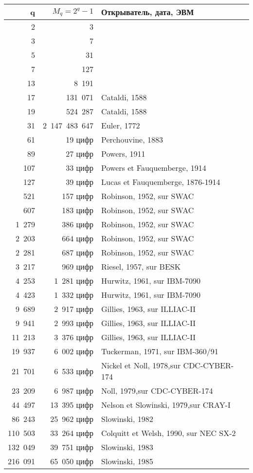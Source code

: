 \documentclass{mai_book}
\begin{document}
\newpage

\begin{tabular}[t]{|r|r|l|}

\hline
q & $M_q=2^q-1$ & Открыватель, дата, ЭВМ \\
\hline
2 & 3 & \\
3 & 7 & \\
5 & 31 & \\
7 & 127 & \\
13 & 8\ 191 \\
17 & 131\ 071 & Cataldi, 1588 \\
19 & 524\ 287 & Cataldi, 1588 \\
31 & 2\ 147\ 483\ 647 & Euler, 1772 \\
61 & 19 цифр & Perchouvine, 1883 \\
89 & 27 цифр & Powers, 1911 \\
107 & 33 цифр & Powers et Fauquemberge, 1914 \\
127 & 39 цифр & Lucas et Fauquemberge, 1876-1914 \\
521 & 157 цифр & Robinson, 1952, sur SWAC \\
607 & 183 цифр & Robinson, 1952, sur SWAC \\
1\ 279 & 386 цифр & Robinson, 1952, sur SWAC \\
2\ 203 & 664 цифр & Robinson, 1952, sur SWAC \\
2\ 281 & 687 цифр & Robinson, 1952, sur SWAC \\
3\ 217 & 969 цифр & Riesel, 1957, sur BESK \\ 
4\ 253 & 1\ 281 цифр & Hurwitz, 1961, sur IBM-7090 \\
4\ 423 & 1\ 332 цифр & Hurwitz, 1961, sur IBM-7090 \\
9\ 689 & 2\ 917 цифр & Gillies, 1963, sur ILLIAC-II \\
9\ 941 & 2\ 993 цифр & Gillies, 1963, sur ILLIAC-II \\
11\ 213 & 3\ 376 цифр & Gillies, 1963, sur ILLIAC-II \\
19\ 937 & 6\ 002 цифр & Tuckerman, 1971, sur IBM-360/91 \\
21\ 701 & 6\ 533 цифр & Nickel et Noll, 1978,sur CDC-CYBER-174 \\
23\ 209 & 6\ 987 цифр & Noll, 1979,sur CDC-CYBER-174 \\
44\ 497 & 13\ 395 цифр & Nelson et Slowinski, 1979,sur CRAY-I \\
86\ 243 & 25\ 962 цифр & Slowinski, 1982 \\
110\ 503 & 33\ 264 цифр & Colquitt et Welsh, 1990, sur NEC SX-2 \\
132\ 049 & 39\ 751 цифр & Slowinski, 1983 \\
216\ 091 & 65\ 050 цифр & Slowinski, 1985 \\
\hline
\end{tabular}
\end{document}
